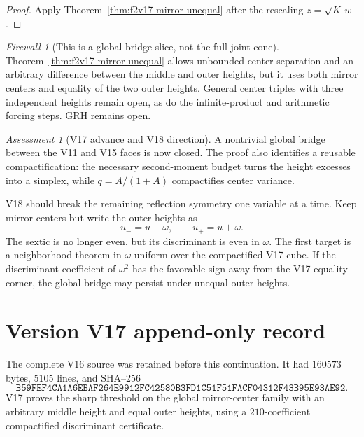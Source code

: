 \documentclass[11pt]{article}
\theoremstyle{definition}
\theoremstyle{remark}
\newtheorem{assessment}[theorem]{Assessment}
\newtheorem{firewall}[theorem]{Firewall}
\begin{document}
\begin{proof}
Apply Theorem~\ref{thm:f2v17-mirror-unequal} after the rescaling
\(z=\sqrt K\,w\).
\end{proof}

\begin{firewall}[This is a global bridge slice, not the full joint cone]
Theorem~\ref{thm:f2v17-mirror-unequal} allows unbounded center separation
and an arbitrary difference between the middle and outer heights, but it
uses both mirror centers and equality of the two outer heights.  General
center triples with three independent heights remain open, as do the
infinite-product and arithmetic forcing steps.  GRH remains open.
\end{firewall}

\begin{assessment}[V17 advance and V18 direction]
A nontrivial global bridge between the V11 and V15 faces is now closed.
The proof also identifies a reusable compactification: the necessary
second-moment budget turns the height excesses into a simplex, while
\(q=A/(1+A)\) compactifies center variance.

V18 should break the remaining reflection symmetry one variable at a
time.  Keep mirror centers but write the outer heights as
\[
 u_-=u-\omega,\qquad u_+=u+\omega.
 \tag{N17.25}
\]
The sextic is no longer even, but its discriminant is even in \(\omega\).
The first target is a neighborhood theorem in \(\omega\) uniform over the
compactified V17 cube.  If the discriminant coefficient of \(\omega^2\)
has the favorable sign away from the V17 equality corner, the global
bridge may persist under unequal outer heights.
\end{assessment}

\section*{Version V17 append-only record}
The complete V16 source was retained before this continuation.  It had
\(160573\) bytes, \(5105\) lines, and SHA--256
\[
 \texttt{B59FEF4CA1A6EBAF264E9912FC42580B3FD1C51F51FACF04312F43B95E93AE92}.
\]
V17 proves the sharp threshold on the global mirror-center family with an
arbitrary middle height and equal outer heights, using a \(210\)-coefficient
compactified discriminant certificate.

\end{document}
